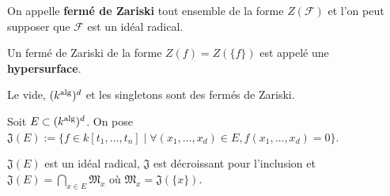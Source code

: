 	\begin{defn}
		On appelle \textbf{fermé de Zariski} tout ensemble de la forme $Z(\mathscr{F})$ et l'on peut supposer que $\mathscr{F}$ est un idéal radical.
	\end{defn}

	\begin{defn}
		Un fermé de Zariski de la forme $Z(f) = Z(\{ f \})$ est appelé une \textbf{hypersurface}.
	\end{defn}

	\begin{rem}
		Le vide, $(k^{\operatorname{alg}})^d$ et les singletons sont des fermés de Zariski.
	\end{rem}

	\begin{note}
		Soit $E \subset (k^{\operatorname{alg}})^d$.
		On pose $\mathfrak{J}(E) := \{ f \in k[t_1,\ldots,t_n] \mid \forall (x_1,\ldots,x_d) \in E, f(x_1,\ldots,x_d) = 0 \}$.
	\end{note}

	\begin{rem}
		$\mathfrak{J}(E)$ est un idéal radical, $\mathfrak{J}$ est décroissant pour l'inclusion et $\mathfrak{J}(E) = \bigcap_{x \in E} \mathfrak{M}_x$ où $\mathfrak{M}_x = \mathfrak{J}(\{ x \})$.
	\end{rem}
